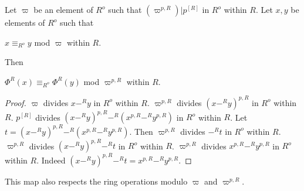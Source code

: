 \documentclass[english,11pt]{article}
\begin{document}
\begin{forthel}

\begin{lemma}Let $\varpi$ be an element of $R^o$ such that
$(\varpi^{p,R}) | p^{[R]}$ in $R^o$ within $R$.
Let $x,y$ be elements of $R^o$ such that

$x \equiv_{R^o} y$ mod $\varpi$ within $R$.

Then 

$\Phi^{R}(x) \equiv_{R^o} \Phi^{R}(y)$ mod $\varpi^{p,R}$ within $R$.
\end{lemma}
\begin{proof}
$\varpi$ divides $x -^{R} y$ in $R^o$ within $R$.
$\varpi^{p,R}$ divides $(x -^{R} y)^{p,R}$ in $R^o$ within $R$.
$p^{[R]}$ divides $(x -^{R} y)^{p,R} -^{R} (x^{p,R} -^{R} y^{p,R})$ in $R^o$ within $R$.
Let $t = (x -^{R} y)^{p,R} -^{R} (x^{p,R} -^{R} y^{p,R})$.
Then $\varpi^{p,R}$ divides $-^{R} t$ in $R^o$ within $R$.
$\varpi^{p,R}$ divides $(x -^{R} y)^{p,R} -^{R} t$ in $R^o$ within $R$.
$\varpi^{p,R}$ divides $x^{p,R} -^{R} y^{p,R}$ in $R^o$ within $R$.
Indeed $(x -^{R} y)^{p,R} -^{R} t = x^{p,R} -^{R} y^{p,R}$.
\end{proof}

\end{forthel}

This map also respects the ring operations modulo 
$\varpi$ and $\varpi^{p,R}$.
\end{document}
